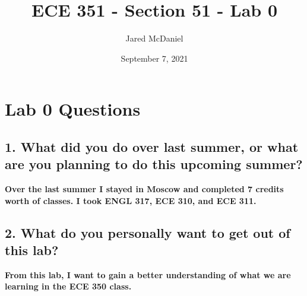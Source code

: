 \documentclass[11pt]{article}
\title{ECE 351 - Section 51 - Lab 0}
\author{Jared McDaniel}
\date{September 7, 2021}
\begin{document}
\maketitle


\section{Lab 0 Questions}
\subsection{1. What did you do over last summer, or what are you planning to do this upcoming summer?}
\textbf{Over the last summer I stayed in Moscow and completed 7 credits worth of classes. I took ENGL 317, ECE 310, and ECE 311.}
\subsection{2. What do you personally want to get out of this lab?}
\textbf{From this lab, I want to gain a better understanding of what we are learning in the ECE 350 class.}
\end{document}
